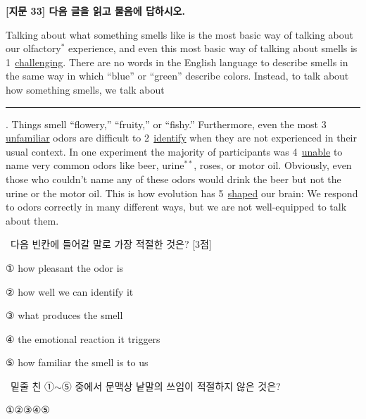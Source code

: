 \documentclass[11pt,a4paper]{article}
\newcommand{\qno}[1]{\par\vspace{8pt}\noindent{\sffamily\bfseries #1.}\ }
\newcommand{\instr}[1]{{\sffamily #1}\par\vspace{3pt}}
\begin{document}
\begin{center}
{\fontsize{15}{17}\selectfont\sffamily\bfseries [지문 33] 다음 글을 읽고 물음에 답하시오.}
\end{center}
\vspace{4pt}

\begin{pbox}
Talking about what something smells like is the most basic way of talking about our olfactory$^{*}$ experience, and even this most basic way of talking about smells is \textcircled{\scriptsize 1}\,\underline{challenging}. There are no words in the English language to describe smells in the same way in which ``blue'' or ``green'' describe colors. Instead, to talk about how something smells, we talk about \rule{3.5cm}{0.4pt}. Things smell ``flowery,'' ``fruity,'' or ``fishy.'' Furthermore, even the most \textcircled{\scriptsize 3}\,\underline{unfamiliar} odors are difficult to \textcircled{\scriptsize 2}\,\underline{identify} when they are not experienced in their usual context. In one experiment the majority of participants was \textcircled{\scriptsize 4}\,\underline{unable} to name very common odors like beer, urine$^{**}$, roses, or motor oil. Obviously, even those who couldn't name any of these odors would drink the beer but not the urine or the motor oil. This is how evolution has \textcircled{\scriptsize 5}\,\underline{shaped} our brain: We respond to odors correctly in many different ways, but we are not well-equipped to talk about them.

\vspace{4pt}
\end{pbox}

\qno{1}\instr{다음 빈칸에 들어갈 말로 가장 적절한 것은? [3점]}
\begin{choices}
\item ① how pleasant the odor is
\item ② how well we can identify it
\item ③ what produces the smell
\item ④ the emotional reaction it triggers
\item ⑤ how familiar the smell is to us
\end{choices}

\qno{2}\instr{밑줄 친 ①$\sim$⑤ 중에서 문맥상 낱말의 쓰임이 적절하지 않은 것은?}
\begin{choices}
\item ①\quad ②\quad ③\quad ④\quad ⑤
\end{choices}
\end{document}
